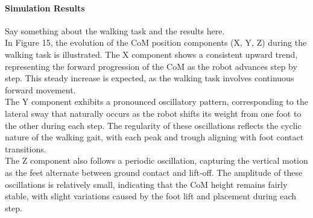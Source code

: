 \documentclass[main.tex]{subfiles}
\begin{document}
\paragraph{Simulation Results}
Say something about the walking task and the results here. \\ 
In Figure 15, the evolution of the CoM position components (X, Y, Z) during the walking task is illustrated. The X component shows a consistent upward trend, representing the forward progression of the CoM as the robot advances step by step. This steady increase is expected, as the walking task involves continuous forward movement. \\
The Y component exhibits a pronounced oscillatory pattern, corresponding to the lateral sway that naturally occurs as the robot shifts its weight from one foot to the other during each step. The regularity of these oscillations reflects the cyclic nature of the walking gait, with each peak and trough aligning with foot contact transitions. \\
The Z component also follows a periodic oscillation, capturing the vertical motion as the feet alternate between ground contact and lift-off. The amplitude of these oscillations is relatively small, indicating that the CoM height remains fairly stable, with slight variations caused by the foot lift and placement during each step.
\end{document}
